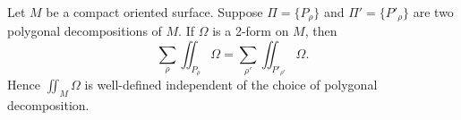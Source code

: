 Let $M$ be a compact oriented surface. Suppose $\Pi = \{P_\rho\}$ and $\Pi' = \{P'_\rho\}$ are two polygonal decompositions of $M$. If $\Omega$ is a 2-form on $M$, then
$$\sum_\rho \iint_{P_\rho} \Omega = \sum_{\rho'} \iint_{P'_{\rho'}} \Omega.$$
Hence $\iint_M \Omega$ is well-defined independent of the choice of polygonal decomposition.